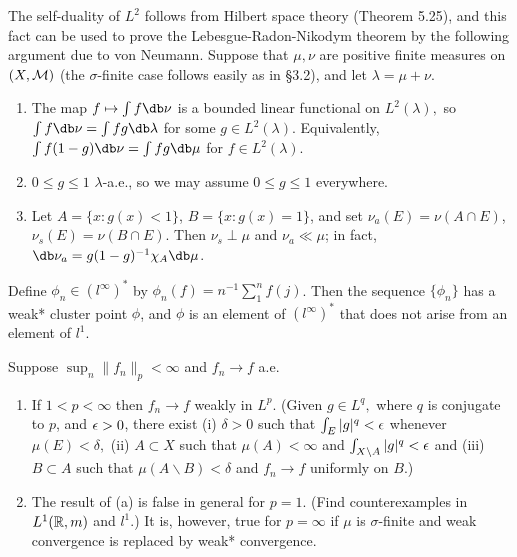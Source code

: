 \documentclass[12pt, a4paper]{article}
\begin{document}
\begin{problem}\label{prob:6-18}
The self-duality of $L^{2}$ follows from Hilbert space theory (Theorem 5.25), and this fact can be used to prove the Lebesgue-Radon-Nikodym theorem by the following argument due to von Neumann. Suppose that $\mu,\nu$ are positive finite measures on $(X,\mathcal{M})$ (the $\sigma$-finite case follows easily as in \S 3.2), and let $\lambda=\mu+\nu$.
\begin{enumerate}[label=\alph*.]
\item The map $f\mapsto\int f\db\nu$ is a bounded linear functional on $L^{2}(\lambda),$ so $\int f\db\nu=\int fg\db\lambda$ for some $g\in L^{2}(\lambda)$. Equivalently, $\int f(1-g)\db\nu=\int fg\db\mu$ for $f\in L^{2}(\lambda)$.
\item $0\le g\le1$ $\lambda$-a.e., so we may assume $0\le g\le1$ everywhere.
\item Let $A=\{x:g(x)<1\}$, $B=\{x:g(x)=1\}$, and set $\nu_{a}(E)=\nu(A\cap E)$, $\nu_{s}(E)=\nu(B\cap E)$. Then $\nu_{s}\perp\mu$ and $\nu_{a}\ll\mu$; in fact, $\db\nu_{a}=g(1-g)^{-1}\chi_{A}\db\mu$.
\end{enumerate}
\end{problem}

\begin{problem}\label{prob:6-19}
Define $\phi_{n}\in(l^{\infty})^{*}$ by $\phi_{n}(f)=n^{-1}\sum_{1}^{n}f(j)$. Then the sequence $\{\phi_{n}\}$ has a weak* cluster point $\phi$, and $\phi$ is an element of $(l^{\infty})^{*}$ that does not arise from an element of $l^{1}$.
\end{problem}

\begin{problem}\label{prob:6-20}
Suppose $\sup_{n}\|f_{n}\|_{p}<\infty$ and $f_{n}\rightarrow f$ a.e.
\begin{enumerate}[label=\alph*.]
\item If $1<p<\infty$ then $f_{n}\rightarrow f$ weakly in $L^{p}$. (Given $g\in L^{q},$ where $q$ is conjugate to $p$, and $\epsilon>0$, there exist (i) $\delta>0$ such that $\int_{E}|g|^{q}<\epsilon$ whenever $\mu(E)<\delta,$ (ii) $A\subset X$ such that $\mu(A)<\infty$ and $\int_{X\backslash A}|g|^{q}<\epsilon$ and (iii) $B\subset A$ such that $\mu(A\backslash B)<\delta$ and $f_{n}\rightarrow f$ uniformly on $B$.)
\item The result of (a) is false in general for $p=1$. (Find counterexamples in $L^{1}(\mathbb{R},m)$ and $l^{1}$.) It is, however, true for $p=\infty$ if $\mu$ is $\sigma$-finite and weak convergence is replaced by weak* convergence.
\end{enumerate}
\end{problem}
\end{document}
